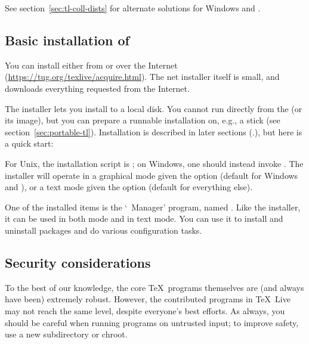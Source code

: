 \documentclass{article}
\begin{document}
See section~\ref{sec:tl-coll-dists} for alternate solutions
for Windows and \MacOSX.

\subsection{Basic installation of \protect\TL{}}
\label{sec:basic}

You can install \TL{} either from \DVD{} or over the Internet
(\url{https://tug.org/texlive/acquire.html}). The net installer itself is
small, and downloads everything requested from the Internet.

The \DVD{} installer lets you install to a local disk.  You cannot run
\TL{} directly from the \TK{} \DVD{} (or its  image), but you
can prepare a runnable installation on, e.g., a \USB{} stick (see
section~\ref{sec:portable-tl}).  Installation is described in later
sections (\p.\pageref{sec:install}), but here is a quick start:

\begin{itemize*}

\item For Unix, the installation script is ; on
  Windows, one should instead invoke .
  The installer will operate in a graphical mode given the option
   (default for Windows and \MacOSX), or a text mode given
  the option  (default for everything else).

\item One of the installed items is the `\TL\ Manager' program,
  named .  Like the installer, it can be used in both \GUI{}
  mode and in text mode. You can use it to install and uninstall
  packages and do various configuration tasks.

\end{itemize*}


\subsection{Security considerations}
\label{sec:security}

To the best of our knowledge, the core \TeX\ programs themselves are
(and always have been) extremely robust.  However, the contributed
programs in \TeX\ Live may not reach the same level, despite everyone's
best efforts.  As always, you should be careful when running programs on
untrusted input; to improve safety, use a new subdirectory or chroot.
\end{document}
